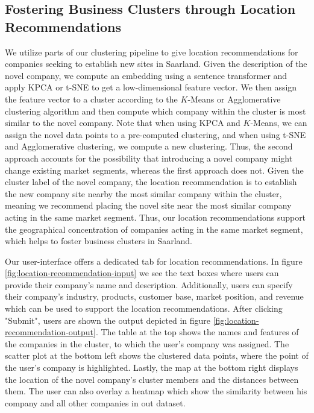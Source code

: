 \documentclass[conference]{IEEEtran}
\begin{document}
\subsection{Fostering Business Clusters through Location Recommendations}
We utilize parts of our clustering pipeline to give location recommendations for companies seeking to establish new sites in Saarland. Given the description of the novel company, we compute an embedding using a sentence transformer and apply KPCA or t-SNE to get a low-dimensional feature vector. We then assign the feature vector to a cluster according to the $K$-Means or Agglomerative clustering algorithm and then compute which company within the cluster is most similar to the novel company. Note that when using KPCA and $K$-Means, we can assign the novel data points to a pre-computed clustering, and when using t-SNE and Agglomerative clustering, we compute a new clustering.
Thus, the second approach accounts for the possibility that introducing a novel company might change existing market segments, whereas the first approach does not.
Given the cluster label of the novel company, the location recommendation is to establish the new company site nearby the most similar company within the cluster, meaning we recommend placing the novel site near the most similar company acting in the same market segment. Thus, our location recommendations support the geographical concentration of companies acting in the same market segment, which helps to foster business clusters in Saarland.

Our user-interface offers a dedicated tab for location recommendations. In figure \ref{fig:location-recommendation-input} we see the text boxes where users can provide their company's name and description. Additionally, users can specify their company's industry, products, customer base, market position, and revenue which can be used to support the location recommendations. After clicking "Submit", users are shown the output depicted in figure \ref{fig:location-recommendation-output}. The table at the top shows the names and features of the companies in the cluster, to which the user's company was assigned. The scatter plot at the bottom left shows the clustered data points, where the point of the user's company is highlighted. Lastly, the map at the bottom right displays the location of the novel company's cluster members and the distances between them. The user can also overlay a heatmap which show the similarity between his company and all other companies in out dataset.
\end{document}
